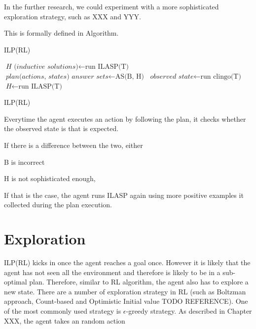 In the further research, we could experiment with a more sophisticated exploration strategy, such as XXX and YYY.

This is formally defined in Algorithm.

\begin{algorithm}
\caption{ILP(RL)}\label{euclid}
\begin{algorithmic}[1]


    \State $\textit{H (inductive solutions)} \gets \text{run ILASP(T)}$
    \State $\textit{plan(actions, states) answer sets} \gets \text{AS(B, H)}$
        \State $\textit{observed state} \gets \text{run clingo(T)}$
            \State $\textit{H} \gets \text{run ILASP(T)}$
            \EndIf
    \EndWhile
\EndWhile

\EndProcedure
\caption{ILP(RL) }
\end{algorithmic}
\end{algorithm}

Everytime the agent executes an action by following the plan, it checks whether the observed state is that is expected.

If there is a difference between the two, either

B is incorrect

H is not sophisticated enough,

If that is the case, the agent runs ILASP again using more positive examples it collected during the plan execution.

\section{Exploration}
\label{exploration}

ILP(RL) kicks in once the agent reaches a goal once. However it is likely that the agent has not seen all the environment
and therefore is likely to be in a sub-optimal plan. Therefore, similar to RL algorithm, the agent also has to explore a new state.
There are a number of exploration strategy in RL (such as Boltzman approach, Count-based and Optimistic Initial value TODO REFERENCE).
One of the most commonly used strategy is $\epsilon$-greedy strategy. As described in Chapter XXX, the agent takes an random action

